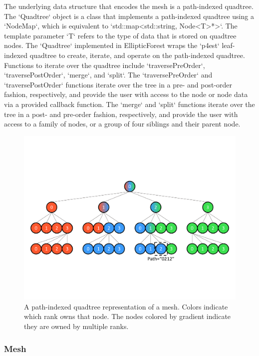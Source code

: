 The underlying data structure that encodes the mesh is a path-indexed quadtree. The `Quadtree` object is a class that implements a path-indexed quadtree using a `NodeMap`, which is equivalent to `std::map<std::string, Node<T>*>`. The template parameter `T` refers to the type of data that is stored on quadtree nodes. The `Quadtree` implemented in EllipticForest wraps the `p4est` leaf-indexed quadtree to create, iterate, and operate on the path-indexed quadtree. Functions to iterate over the quadtree include `traversePreOrder`, `traversePostOrder`, `merge`, and `split`. The `traversePreOrder` and `traversePostOrder` functions iterate over the tree in a pre- and post-order fashion, respectively, and provide the user with access to the node or node data via a provided callback function. The `merge` and `split` functions iterate over the tree in a post- and pre-order fashion, respectively, and provide the user with access to a family of nodes, or a group of four siblings and their parent node.

\begin{figure}
    \centering
    \includegraphics[width=\textwidth, clip=true, trim={0 100 0 100}]{figures/parallel_path_indexed_tree.pdf}
    \caption{A path-indexed quadtree representation of a mesh. Colors indicate which rank owns that node. The nodes colored by gradient indicate they are owned by multiple ranks.}
    \label{fig:parallel_quadtree}
\end{figure}

\subsubsection{Mesh}

